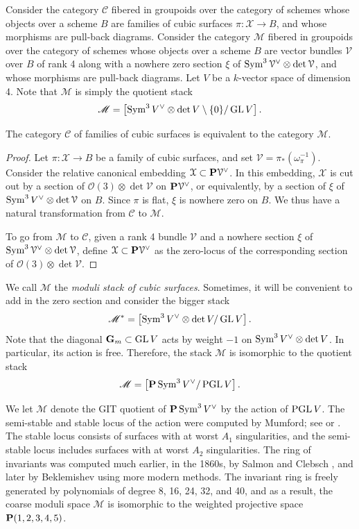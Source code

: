 \documentclass[12pt,reqno]{amsart}
\renewcommand{\k}{k}
\renewcommand{\to}{{\longrightarrow}}
\numberwithin{equation}{section}
\renewcommand{\O}{\mathcal O}
\newcommand{\G}{\mathbf G}
\newcommand{\cX}{\mathcal{X}}
\begin{document}
Consider the category $\mathscr {C}$ fibered in groupoids over the
category of schemes whose objects over a scheme $B$ are families of
cubic surfaces $\pi \colon \cX \to B$, and whose morphisms are pull-back
diagrams.  Consider the category $\mathscr {M}$ fibered in groupoids
over the category of schemes whose objects over a scheme $B$ are
vector bundles $\mathcal V$ over $B$ of rank 4 along with a nowhere
zero section $\xi$ of
$\Sym^3 \mathcal V^\vee \otimes \det \mathcal V$, and whose morphisms
are pull-back diagrams.  Let $V$ be a $\k$-vector space of dimension
4.  Note that $\mathscr{M}$ is simply the quotient stack
\[\mathscr{M} = \left[\Sym^3 V^\vee \otimes \det V \setminus \{0\} / \GL V \right]. \]
\begin{proposition}\label{prop:cubicstack}
  The category $\mathscr{C}$ of families of cubic surfaces is equivalent to the category $\mathscr{M}$.
\end{proposition}
\begin{proof}
  Let $\pi \colon \cX \to B$ be a family of cubic surfaces, and set
  $\mathcal V = \pi_* \left( \omega_{\pi}^{-1} \right)$.  Consider the
  relative canonical embedding $\cX \subset \P \mathcal V^\vee$.  In
  this embedding, $\cX$ is cut out by a section of
  $\O(3) \otimes \det \mathcal V$ on $\P \mathcal V^\vee$, or
  equivalently, by a section of $\xi$ of
  $\Sym^3V^\vee \otimes \det \mathcal V$ on $B$.  Since $\pi$ is flat,
  $\xi$ is nowhere zero on $B$.  We thus have a natural transformation
  from $\mathscr{C}$ to $\mathscr{M}$.

  To go from $\mathscr{M}$ to $\mathscr{C}$, given a rank 4 bundle $\mathcal V$ and a nowhere section $\xi$ of $\Sym^3 \mathcal V^\vee \otimes \det \mathcal V$, define $\cX \subset \P \mathcal V^\vee$ as the zero-locus of the corresponding section of $\O(3) \otimes \det \mathcal V$.
\end{proof}

We call $\mathscr{M}$ the \emph{moduli stack of cubic surfaces}.
Sometimes, it will be convenient to add in the zero section and consider the bigger stack
\[ \mathscr{M}^* = \left[\Sym^3 V^\vee \otimes \det V / \GL V \right].\]
Note that the diagonal $\G_m \subset \GL V$ acts by weight $-1$ on $\Sym^3 V^\vee \otimes \det V$.
In particular, its action is free.
Therefore, the stack $\mathscr{M}$ is isomorphic to the quotient stack
\[ \mathscr{M} = \left[ \P \Sym^3V^\vee / \PGL V \right].\]

We let $\mathcal M$ denote the GIT quotient of $\P \Sym^3V^\vee$ by
the action of $\PGL V$.  The semi-stable and stable locus of the
action were computed by Mumford; see \cite[Chapter 4, \S
2]{mum.fog.kir:94} or \cite[1.14]{mum:77}.  The stable locus consists
of surfaces with at worst $A_1$ singularities, and the semi-stable
locus includes surfaces with at worst $A_2$ singularities.  The ring
of invariants was computed much earlier, in the 1860s, by Salmon
\cite{sal.cay:60} and Clebsch \cite{cle:61,cle:61*1}, and later by
Beklemishev \cite{bek:82} using more modern methods.  The invariant
ring is freely generated by polynomials of degree 8, 16, 24, 32, and
40, and as a result, the coarse moduli space $\mathcal M$ is
isomorphic to the weighted projective space $\P(1,2,3,4,5)$.
\end{document}
